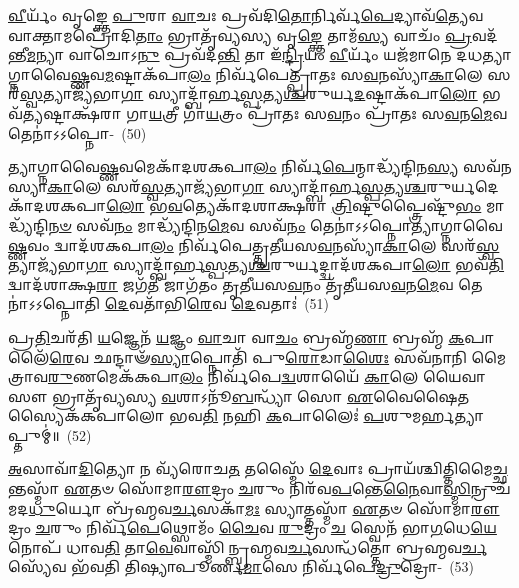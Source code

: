 \-\ul{𑌵𑍀}\-𑌰𑍍𑌯𑌂᳴ 𑌵𑍃𑌙𑍍𑌕𑍍𑌤𑍇 \ul{𑌪𑍁}\-𑌰𑌾 \ul{𑌵𑌾}\-𑌚𑌃 𑌪𑍍𑌰𑌵᳴𑌦𑌿\-\ul{𑌤𑍋}\-𑌰𑍍𑌨𑌿𑌰𑍍𑌵᳴\-\ul{𑌪𑍇}\-𑌦𑍍𑌯𑌾𑌵᳴\-\ul{𑌤𑍍𑌯𑍇}\-𑌵 𑌵𑌾𑌕𑍍𑌤𑌾𑌮𑌪𑍍𑌰𑍋᳴𑌦𑌿\-\ul{𑌤𑌾𑌂} 𑌭𑍍𑌰𑌾𑌤𑍃᳴𑌵𑍍𑌯𑌸𑍍𑌯 𑌵𑍃\-\ul{𑌙𑍍𑌕𑍍𑌤𑍇} 𑌤𑌾𑌮᳴\-\ul{𑌸𑍍𑌯} 𑌵𑌾𑌚𑌂᳴ \ul{𑌪𑍍𑌰}\-𑌵𑌦᳴𑌨𑍍𑌤𑍀\-\ul{𑌮}\-𑌨𑍍𑌯𑌾 𑌵𑌾𑌚𑍋\-𑌽\-\ul{𑌨𑍁} 𑌪𑍍𑌰𑌵᳴𑌦\-\ul{𑌨𑍍𑌤𑌿} 𑌤𑌾 𑌇᳴\-\ul{𑌨𑍍𑌦𑍍𑌰𑌿}\-𑌯𑌂 \ul{𑌵𑍀}\-𑌰𑍍𑌯𑌂᳴ 𑌯𑌜᳴𑌮𑌾𑌨𑍇 𑌦𑌧𑌤𑍍𑌯𑌾𑌗𑍍𑌨𑌾\-𑌵𑍈\-\ul{𑌷𑍍𑌣}\-𑌵\-\-\ul{𑌮}\-𑌷𑍍𑌟𑌾\-𑌕᳴𑌪𑌾\-\ul{𑌲𑌂} 𑌨𑌿𑌰𑍍𑌵᳴𑌪𑍇𑌤𑍍𑌪𑍍𑌰𑌾𑌤𑌃 𑌸\-\ul{𑌵}\-𑌨𑌸𑍍𑌯𑌾᳴\-\ul{𑌕𑌾}\-𑌲𑍇 𑌸𑌰᳴\-\ul{𑌸𑍍𑌵}\-𑌤𑍍𑌯𑌾𑌜𑍍𑌯᳴𑌭𑌾\-\ul{𑌗𑌾} 𑌸𑍍𑌯𑌾𑌦𑍍𑌬𑌾᳴𑌰𑍍\mbox{}𑌹\-\ul{𑌸𑍍𑌪}\-𑌤𑍍𑌯\-\ul{𑌶𑍍𑌚}\-𑌰𑍁𑌰𑍍𑌯\-\ul{𑌦}\-𑌷𑍍𑌟𑌾𑌕᳴𑌪𑌾\-\ul{𑌲𑍋} 𑌭𑌵᳴\-\ul{𑌤𑍍𑌯}\-𑌷𑍍𑌟𑌾𑌕𑍍𑌷᳴𑌰𑌾 𑌗𑌾\-\ul{𑌯}\-𑌤𑍍𑌰𑍀 𑌗𑌾᳴\-\ul{𑌯}\-𑌤𑍍𑌰𑌂 𑌪𑍍𑌰𑌾᳴𑌤𑌃 𑌸\-\ul{𑌵}\-𑌨𑌂 𑌪𑍍𑌰𑌾᳴𑌤𑌃 𑌸\-\ul{𑌵}\-𑌨\-\ul{𑌮𑍇}\-𑌵 𑌤𑍇𑌨𑌾॑𑌽𑌽𑌪𑍍𑌨𑍋-~(50)

𑌤𑍍𑌯𑌾𑌗𑍍𑌨𑌾𑌵𑍈\-\ul{𑌷𑍍𑌣}\-𑌵𑌮𑍇𑌕𑌾᳴\-𑌦𑌶\-𑌕𑌪𑌾\-\ul{𑌲𑌂} 𑌨𑌿𑌰𑍍𑌵᳴\-\ul{𑌪𑍇}\-𑌨𑍍𑌮𑌾𑌦𑍍𑌧𑍍𑌯᳴𑌨𑍍𑌦𑌿𑌨\-\ul{𑌸𑍍𑌯} 𑌸𑌵᳴𑌨𑌸𑍍𑌯𑌾\-\ul{𑌕𑌾}\-𑌲𑍇 𑌸𑌰᳴\-\ul{𑌸𑍍𑌵}\-𑌤𑍍𑌯𑌾𑌜𑍍𑌯᳴𑌭𑌾\-\ul{𑌗𑌾} 𑌸𑍍𑌯𑌾𑌦𑍍𑌬𑌾᳴𑌰𑍍\mbox{}𑌹\-\ul{𑌸𑍍𑌪}\-𑌤𑍍𑌯\-\ul{𑌶𑍍𑌚}\-𑌰𑍁𑌰𑍍𑌯𑌦𑍇𑌕𑌾᳴\-𑌦𑌶\-𑌕𑌪𑌾\-\ul{𑌲𑍋} 𑌭\-\ul{𑌵}\-𑌤𑍍𑌯𑍇𑌕𑌾᳴\-𑌦𑌶𑌾𑌕𑍍𑌷𑌰𑌾 \ul{𑌤𑍍𑌰𑌿}\-𑌷𑍍𑌟𑍁𑌪𑍍𑌤𑍍𑌰𑍈𑌷𑍍𑌟𑍁᳴\-\ul{𑌭𑌂} 𑌮𑌾𑌦𑍍𑌧𑍍𑌯᳴𑌨𑍍𑌦𑌿\-\ul{𑌨}\-\-\ul{𑍞} 𑌸𑌵᳴\-\ul{𑌨𑌂} 𑌮𑌾𑌦𑍍𑌧𑍍𑌯᳴𑌨𑍍𑌦𑌿𑌨\-\ul{𑌮𑍇}\-𑌵 𑌸𑌵᳴\-\ul{𑌨𑌂} 𑌤𑍇𑌨𑌾॑𑌽𑌽𑌪𑍍𑌨𑍋𑌤𑍍𑌯𑌾𑌗𑍍𑌨𑌾𑌵𑍈\-\ul{𑌷𑍍𑌣}\-𑌵𑌂 𑌦𑍍𑌵𑌾𑌦᳴𑌶\-𑌕𑌪𑌾\-\ul{𑌲𑌂} 𑌨𑌿𑌰𑍍𑌵᳴𑌪𑍇𑌤𑍍𑌤𑍃𑌤𑍀𑌯𑌸\-\ul{𑌵}\-𑌨𑌸𑍍𑌯𑌾᳴\-\ul{𑌕𑌾}\-𑌲𑍇 𑌸𑌰᳴\-\ul{𑌸𑍍𑌵}\-𑌤𑍍𑌯𑌾𑌜𑍍𑌯᳴𑌭𑌾\-\ul{𑌗𑌾} 𑌸𑍍𑌯𑌾𑌦𑍍𑌬𑌾᳴𑌰𑍍\mbox{}𑌹\-\-\ul{𑌸𑍍𑌪}\-𑌤𑍍𑌯\-\ul{𑌶𑍍𑌚}\-𑌰𑍁𑌰𑍍𑌯𑌦𑍍𑌦𑍍𑌵𑌾𑌦᳴𑌶\-𑌕𑌪𑌾\-\ul{𑌲𑍋} 𑌭𑌵᳴\-\ul{𑌤𑌿} 𑌦𑍍𑌵𑌾𑌦᳴𑌶𑌾𑌕𑍍𑌷\-\ul{𑌰𑌾} 𑌜𑌗᳴\-\ul{𑌤𑍀} 𑌜𑌾𑌗᳴𑌤𑌂 𑌤𑍃𑌤𑍀𑌯𑌸\-\ul{𑌵}\-𑌨𑌂 𑌤𑍃᳴𑌤𑍀𑌯𑌸\-\ul{𑌵}\-𑌨\-\ul{𑌮𑍇}\-𑌵 𑌤𑍇𑌨𑌾॑𑌽𑌽𑌪𑍍𑌨𑍋𑌤𑌿 \ul{𑌦𑍇}\-𑌵𑌤𑌾᳴𑌭𑌿\-\ul{𑌰𑍇}\-𑌵 \ul{𑌦𑍇}\-𑌵𑌤𑌾𑌃॑~(51)

𑌪𑍍𑌰\-\ul{𑌤𑌿}\-𑌚𑌰᳴𑌤𑌿 \ul{𑌯}\-𑌜𑍍𑌞𑍇𑌨᳴ \ul{𑌯}\-𑌜𑍍𑌞𑌂 \ul{𑌵𑌾}\-𑌚𑌾 𑌵𑌾\-\ul{𑌚𑌂} 𑌬𑍍𑌰𑌹𑍍𑌮᳴\-\ul{𑌣𑌾} 𑌬𑍍𑌰𑌹𑍍𑌮᳴ \ul{𑌕}\-𑌪𑌾𑌲𑍈᳴\-\ul{𑌰𑍇}\-𑌵 𑌛𑌨𑍍𑌦𑌾𑍟᳴\-\ul{𑌸𑍍𑌯𑌾}\-𑌪𑍍𑌨𑍋𑌤𑌿᳴ 𑌪𑍁\-\ul{𑌰𑍋}\-𑌡𑌾\-\ul{𑌶𑍈𑌃} 𑌸𑌵᳴𑌨𑌾𑌨𑌿 𑌮𑍈𑌤𑍍𑌰𑌾𑌵\-\ul{𑌰𑍁}\-𑌣𑌮𑍇𑌕᳴𑌕𑌪𑌾\-\ul{𑌲𑌂} 𑌨𑌿𑌰𑍍𑌵᳴𑌪𑍇\-\ul{𑌦𑍍𑌵}\-𑌶𑌾𑌯𑍈᳴ \ul{𑌕𑌾}\-𑌲𑍇 𑌯𑍈𑌵𑌾𑌸𑍗 𑌭𑍍𑌰𑌾𑌤𑍃᳴𑌵𑍍𑌯𑌸𑍍𑌯 \ul{𑌵}\-𑌶𑌾\-𑌽𑌨𑍂᳴\-\ul{𑌬}\-𑌨𑍍𑌧𑍍𑌯𑌾᳴ 𑌸𑍋 \ul{𑌏}\-𑌵𑍈𑌷𑍈𑌤𑌸𑍍𑌯𑍈𑌕᳴𑌕𑌪𑌾𑌲𑍋 𑌭𑌵\-\ul{𑌤𑌿} 𑌨𑌹𑌿 \ul{𑌕}\-𑌪𑌾𑌲𑍈𑌃॑ \ul{𑌪}\-𑌶𑍁𑌮𑌰𑍍\mbox{}\-\ul{𑌹}\-𑌤𑍍𑌯𑌾𑌪𑍍𑌤𑍁𑌮𑍍॑॥~(52)

{\anuvakamend[{𑌬𑍍𑌰𑌹𑍍𑌮᳴\-\ul{𑌣𑍈}\-𑌵𑍈𑌨᳴\-\ul{𑌮}\-𑌭𑌿𑌚᳴𑌰𑌤𑌿 \ul{𑌯}\-𑌜𑍍𑌞𑍋 𑌨 𑌤𑌾\-\ul{𑌵𑍇}\-𑌵𑌾𑌸𑍍𑌯𑍇॑\-\ul{𑌨𑍍𑌦𑍍𑌰𑌿}\-𑌯𑌮𑌾॑𑌪𑍍𑌨𑍋𑌤𑌿 \ul{𑌦𑍇}\-𑌵𑌤𑌾𑌃॑ \ul{𑌸}\-𑌪𑍍𑌤𑌤𑍍𑌰𑌿𑍞᳴𑌶𑌚𑍍𑌚।}]}

\-\ul{𑌅}\-𑌸𑌾𑌵𑌾᳴\-\ul{𑌦𑌿}\-𑌤𑍍𑌯𑍋 𑌨 𑌵𑍍𑌯᳴𑌰𑍋𑌚\-\ul{𑌤} 𑌤𑌸𑍍𑌮𑍈᳴ \ul{𑌦𑍇}\-𑌵𑌾𑌃 𑌪𑍍𑌰𑌾𑌯᳴𑌶𑍍𑌚𑌿𑌤𑍍𑌤𑌿\-𑌮𑍈\-\ul{𑌚𑍍𑌛}\-𑌨𑍍𑌤𑌸𑍍𑌮𑌾᳴ \ul{𑌏}\-𑌤𑍞 𑌸𑍋᳴𑌮𑌾\-\ul{𑌰𑍗}\-𑌦𑍍𑌰𑌂 \ul{𑌚}\-𑌰𑍁𑌂 𑌨𑌿𑌰᳴𑌵\-\ul{𑌪}\-𑌨𑍍𑌤𑍇\-\ul{𑌨𑍈}\-𑌵𑌾\-\ul{𑌸𑍍𑌮𑌿}\-𑌨𑍍𑌰𑍁𑌚᳴𑌮𑌦\-\-\ul{𑌧𑍁}\-𑌰𑍍𑌯𑍋 𑌬𑍍𑌰᳴𑌹𑍍𑌮𑌵\-\ul{𑌰𑍍𑌚}\-𑌸𑌕𑌾᳴\-\ul{𑌮𑌃} 𑌸𑍍𑌯𑌾𑌤𑍍𑌤𑌸𑍍𑌮𑌾᳴ \ul{𑌏}\-𑌤𑍞 𑌸𑍋᳴𑌮𑌾\-\ul{𑌰𑍗}\-𑌦𑍍𑌰𑌂 \ul{𑌚}\-𑌰𑍁𑌂 𑌨𑌿𑌰𑍍𑌵᳴\-\ul{𑌪𑍇}\-𑌥𑍍𑌸𑍋𑌮𑌂᳴ \ul{𑌚𑍈}\-𑌵 \ul{𑌰𑍁}\-𑌦𑍍𑌰𑌂 \ul{𑌚} 𑌸𑍍𑌵𑍇𑌨᳴ 𑌭𑌾\-\ul{𑌗}\-𑌧𑍇\-\ul{𑌯𑍇}\-𑌨𑍋𑌪᳴ 𑌧𑌾𑌵\-\ul{𑌤𑌿} 𑌤𑌾\-\ul{𑌵𑍇}\-𑌵𑌾𑌸𑍍𑌮𑌿᳴𑌨𑍍𑌬𑍍𑌰𑌹𑍍𑌮𑌵\-\ul{𑌰𑍍𑌚}\-𑌸𑌨𑍍𑌧᳴𑌤𑍍𑌤𑍋 𑌬𑍍𑌰𑌹𑍍𑌮𑌵\-\ul{𑌰𑍍𑌚}\-𑌸𑍍𑌯𑍇᳴𑌵 𑌭᳴𑌵𑌤𑌿 𑌤𑌿𑌷𑍍𑌯𑌾𑌪𑍂𑌰𑍍𑌣\-\ul{𑌮𑌾}\-𑌸𑍇 𑌨𑌿𑌰𑍍𑌵᳴𑌪𑍇\-\ul{𑌦𑍍𑌰𑍁}\-𑌦𑍍𑌰𑍋-~(53)

